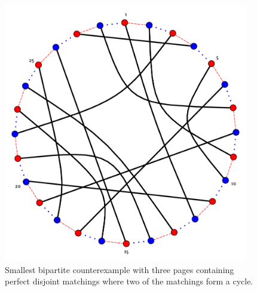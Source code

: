 \begin{figure}[\placement]
\centering

\includegraphics[width=0.95\textwidth]{figures/two_cycles.pdf}

\caption[Smallest bipartite counterexample with three pages]{Smallest bipartite counterexample with three pages containing perfect disjoint matchings where two of the matchings form a cycle.}
\label{figure:two_cycles}
\end{figure}
